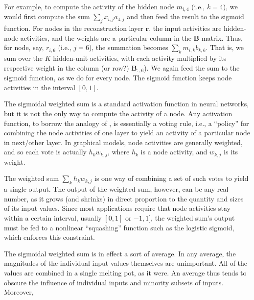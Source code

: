 For example, to compute the activity of the hidden node $m_{i,4}$ (i.e., $k = 4$), 
we would first compute the sum $\sum_{j} x_{i,j} a_{4,j}$
and then feed the result to the sigmoid function. For nodes in the reconstruction 
layer $\textbf{r}$, the input activities are hidden-node activities, and the weights 
are a particular column in the $\textbf{B}$ matrix. Thus, for node, say, 
$r_{i,6}$ (i.e., $j=6$), the summation becomes
$\sum_{k} m_{i,k} b_{k,6}$.  That is, we sum over the $K$ hidden-unit activities, with each activity multiplied by its respective weight in the column (or row?) $\textbf{B}_{:,6}$). 
We again feed the sum to the sigmoid function, as we do for every node. 
The sigmoid function keeps node activities in the interval $[0,1]$.

The sigmoidal weighted sum is a standard activation function in neural networks, 
but it is not the only way to compute the activity of a node. Any activation function, to borrow
the analogy of \citet{saund:94}, is essentially a voting rule, i.e.,  a ``policy'' for combining the node activities of one layer to yield an activity of a particular node in next/other layer. In graphical models, node activities are generally weighted, and so each vote is actually $h_{k} w_{k,j} $, where $h_{k}$ is a node activity, and $w_{k,j}$ is its weight. 

The weighted sum $\sum_{k} h_{k} w_{k,j}$ is one way of combining a set of such votes to yield a single output. The output of the weighted sum, however, can be any real number, as it grows (and shrinks) in direct proportion to the quantity and sizes of its input values. Since most applications require that node activities stay within a certain interval, usually $[0,1]$ or $-1,1]$, the weighted sum's output must be fed to a nonlinear ``squashing'' function such as the logistic sigmoid, which enforces this constraint.

The sigmoidal weighted sum is in effect a sort of average. In any average, the magnitudes of the individual input values themselves are unimportant. All of the values are combined in a single melting pot, as it were. An average thus tends to obscure the influence of individual inputs and minority subsets of inputs.
Moreover, 

